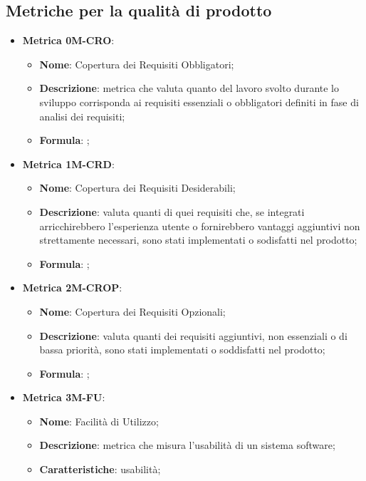 \subsection{Metriche per la qualità di prodotto}
\begin{itemize}
    \item \textbf{Metrica 0M-CRO}:
    \begin{itemize}
        \item \textbf{Nome}: Copertura dei Requisiti Obbligatori;
        \item \textbf{Descrizione}: metrica che valuta quanto del lavoro svolto durante lo sviluppo corrisponda ai requisiti essenziali o obbligatori definiti in fase di analisi dei requisiti;
        \item \textbf{Formula}: ;
    \end{itemize}
\end{itemize}

\begin{itemize}
    \item \textbf{Metrica 1M-CRD}:
    \begin{itemize}
        \item \textbf{Nome}: Copertura dei Requisiti Desiderabili;
        \item \textbf{Descrizione}: valuta quanti di quei requisiti che, se integrati arricchirebbero l'esperienza utente o fornirebbero vantaggi aggiuntivi non strettamente necessari, sono stati implementati o sodisfatti nel prodotto;
        \item \textbf{Formula}: ;
    \end{itemize}
\end{itemize}

\begin{itemize}
    \item \textbf{Metrica 2M-CROP}:
    \begin{itemize}
        \item \textbf{Nome}: Copertura dei Requisiti Opzionali;
        \item \textbf{Descrizione}: valuta quanti dei requisiti aggiuntivi, non essenziali o di bassa priorità, sono stati implementati o soddisfatti nel prodotto;
        \item \textbf{Formula}: ;
    \end{itemize}
\end{itemize}

\begin{itemize}
    \item \textbf{Metrica 3M-FU}:
    \begin{itemize}
        \item \textbf{Nome}: Facilità di Utilizzo;
        \item \textbf{Descrizione}: metrica che misura l'usabilità di un sistema software;
        \item \textbf{Caratteristiche}: usabilità;
    \end{itemize}
\end{itemize}

